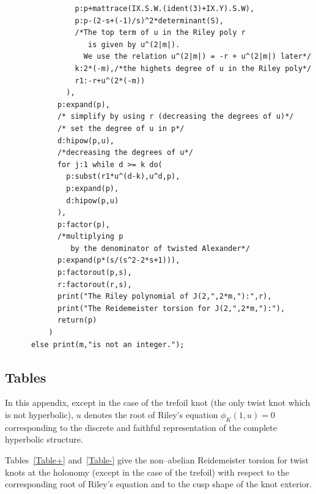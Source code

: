 \documentclass[a4paper]{amsart}
\theoremstyle{plain}
\theoremstyle{definition}
\theoremstyle{remark}
\begin{document}
\begin{small}
\begin{verbatim}
                p:p+mattrace(IX.S.W.(ident(3)+IX.Y).S.W),
                p:p-(2-s+(-1)/s)^2*determinant(S),
                /*The top term of u in the Riley poly r 
                   is given by u^(2|m|). 
                  We use the relation u^(2|m|) = -r + u^(2|m|) later*/
                k:2*(-m),/*the highets degree of u in the Riley poly*/
                r1:-r+u^(2*(-m))
              ),
            p:expand(p),
            /* simplify by using r (decreasing the degrees of u)*/
            /* set the degree of u in p*/
            d:hipow(p,u),
            /*decreasing the degrees of u*/
            for j:1 while d >= k do(
              p:subst(r1*u^(d-k),u^d,p),
              p:expand(p),
              d:hipow(p,u)
            ),
            p:factor(p),
            /*multiplying p 
               by the denominator of twisted Alexander*/
            p:expand(p*(s/(s^2-2*s+1))),
            p:factorout(p,s),
            r:factorout(r,s),
            print("The Riley polynomial of J(2,",2*m,"):",r),
            print("The Reidemeister torsion for J(2,",2*m,"):"),
            return(p)
          )
      else print(m,"is not an integer.");
\end{verbatim}
\end{small}

\subsection{Tables}
In this appendix, except in the case of the trefoil knot (the only twist knot which is not hyperbolic), $u$ denotes the root of Riley's equation $\phi_{K}(1, u) = 0$ corresponding to the discrete and faithful representation of the complete hyperbolic structure. 


Tables~\ref{Table+} and~\ref{Table-} give the non--abelian Reidemeister torsion for twist knots at the holonomy (except in the case of the trefoil) with respect to the corresponding root of Riley's equation and to the cusp shape of the knot exterior.




\hfill
\end{document}
